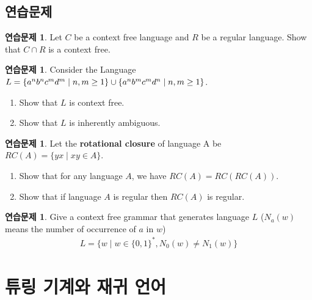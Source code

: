 \documentclass[b5paper, 10pt]{book}
\theoremstyle{definition}
\newtheorem{ec}[defn]{연습문제}
\begin{document}
\section{연습문제}
\begin{ec}
    Let $C$ be a context free language and $R$ be a regular language. 
    Show that $C \cap R$ is a context free. 
\end{ec}
\begin{ec}
    Consider the Language $L = \{a^nb^nc^md^m \;\vert\; n, m \ge 1\} \\ \cup \{a^nb^mc^md^n \;\vert\; n,m \ge 1\}$.
    \begin{enumerate}
        \item Show that $L$ is context free.
        \item Show that $L$ is inherently ambiguous. 
    \end{enumerate}
\end{ec}
\begin{ec}
    Let the \textbf{rotational closure} of language A be $RC(A) = \{yx\;\vert\; xy \in A\}$.
    \begin{enumerate}
        \item Show that for any language $A$, we have $RC(A) = RC(RC(A))$.
        \item Show that if language $A$ is regular then $RC(A)$ is regular.
    \end{enumerate}
\end{ec}
\begin{ec}
    Give a context free grammar that generates language $L$ 
    ($N_a(w)$ means the number of occurrence of $a$ in $w$) 
    \begin{align*}
        L = \{ w \;\vert\; w \in \{0,1\}^*, N_0(w) \neq N_1(w) \}
    \end{align*}
\end{ec}
\chapter{튜링 기계와 재귀 언어} 
\end{document}
